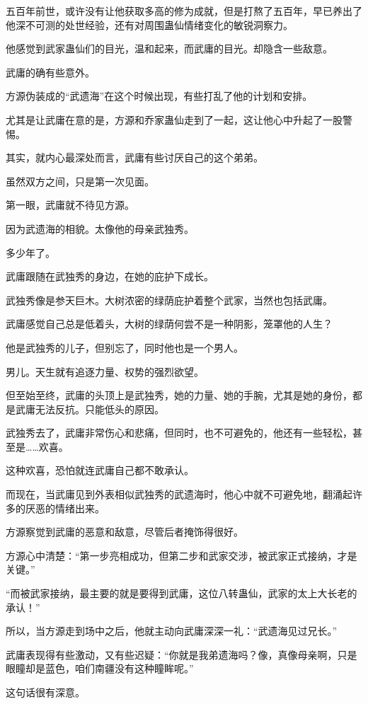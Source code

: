 \begin{this_body}
五百年前世，或许没有让他获取多高的修为成就，但是打熬了五百年，早已养出了他深不可测的处世经验，还有对周围蛊仙情绪变化的敏锐洞察力。

他感觉到武家蛊仙们的目光，温和起来，而武庸的目光。却隐含一些敌意。

武庸的确有些意外。

方源伪装成的“武遗海”在这个时候出现，有些打乱了他的计划和安排。

尤其是让武庸在意的是，方源和乔家蛊仙走到了一起，这让他心中升起了一股警惕。

其实，就内心最深处而言，武庸有些讨厌自己的这个弟弟。

虽然双方之间，只是第一次见面。

第一眼，武庸就不待见方源。

因为武遗海的相貌。太像他的母亲武独秀。

多少年了。

武庸跟随在武独秀的身边，在她的庇护下成长。

武独秀像是参天巨木。大树浓密的绿荫庇护着整个武家，当然也包括武庸。

武庸感觉自己总是低着头，大树的绿荫何尝不是一种阴影，笼罩他的人生？

他是武独秀的儿子，但别忘了，同时他也是一个男人。

男儿。天生就有追逐力量、权势的强烈欲望。

但至始至终，武庸的头顶上是武独秀，她的力量、她的手腕，尤其是她的身份，都是武庸无法反抗。只能低头的原因。

武独秀去了，武庸非常伤心和悲痛，但同时，也不可避免的，他还有一些轻松，甚至是……欢喜。

这种欢喜，恐怕就连武庸自己都不敢承认。

而现在，当武庸见到外表相似武独秀的武遗海时，他心中就不可避免地，翻涌起许多的厌恶的情绪出来。

方源察觉到武庸的恶意和敌意，尽管后者掩饰得很好。

方源心中清楚：“第一步亮相成功，但第二步和武家交涉，被武家正式接纳，才是关键。”

“而被武家接纳，最主要的就是要得到武庸，这位八转蛊仙，武家的太上大长老的承认！”

所以，当方源走到场中之后，他就主动向武庸深深一礼：“武遗海见过兄长。”

武庸表现得有些激动，又有些迟疑：“你就是我弟遗海吗？像，真像母亲啊，只是眼瞳却是蓝色，咱们南疆没有这种瞳眸呢。”

这句话很有深意。


\end{this_body}
